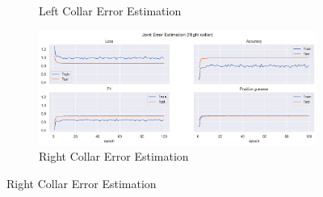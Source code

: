 \begin{figure}[!ht]
\begin{subfigure}[b]{0.47\linewidth}
      \caption{Left Collar Error Estimation}
      \label{fig:v1_leco_jt_ee}
  \end{subfigure}
  \hfill
  \begin{subfigure}[b]{0.47\linewidth}
      \centering
      \includegraphics[width=\textwidth]{figures/Results/v1_bs_60_is_64_e_100/jt/Right collar_ErrorEstimation.png}
      \caption{Right Collar Error Estimation}
      \label{fig:v1_rico_jt_ee}
  \end{subfigure}
\end{figure}


